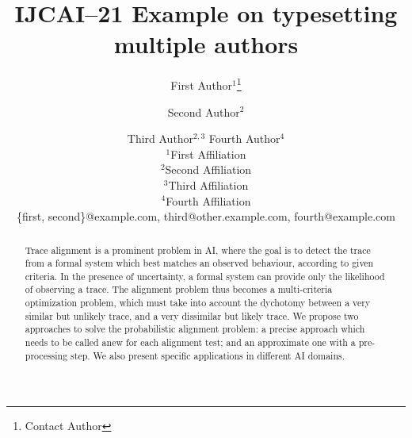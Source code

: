 \documentclass{article}
\title{IJCAI--21 Example on typesetting multiple authors}
\author{
First Author$^1$\footnote{Contact Author}\and
Second Author$^2$\and
Third Author$^{2,3}$\And
Fourth Author$^4$\\
\affiliations
$^1$First Affiliation\\
$^2$Second Affiliation\\
$^3$Third Affiliation\\
$^4$Fourth Affiliation\\
\emails
\{first, second\}@example.com,
third@other.example.com,
fourth@example.com
}
\begin{document}
\maketitle

\begin{abstract}
Trace alignment is a prominent problem in AI, where the goal is to detect the trace from a formal 
system which best matches an observed behaviour, according to given criteria. In the presence of uncertainty, a
formal system can provide only the likelihood of observing a trace. The alignment problem thus becomes a multi-criteria
optimization problem, which must take into account the dychotomy between a very similar but unlikely trace, and a very
dissimilar but likely trace. We propose two approaches to solve the probabilistic alignment problem: a precise approach which
needs to be called anew for each alignment test; and an approximate one with a pre-processing step. We also present
specific applications in different AI domains.
\end{abstract}










\end{document}
